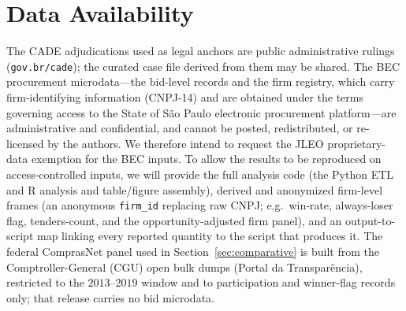 
\section*{Data Availability}

The CADE adjudications used as legal anchors are public administrative
rulings (\texttt{gov.br/cade}); the curated case file derived from them
may be shared. The BEC procurement microdata---the bid-level records and
the firm registry, which carry firm-identifying information (CNPJ-14) and
are obtained under the terms governing access to the State of S\~ao Paulo
electronic procurement platform---are administrative and confidential, and
cannot be posted, redistributed, or re-licensed by the authors. We
therefore intend to request the JLEO proprietary-data exemption for the
BEC inputs. To allow the results to be reproduced on access-controlled
inputs, we will provide the full analysis code (the Python ETL and R
analysis and table/figure assembly), derived and anonymized firm-level
frames (an anonymous \texttt{firm\_id} replacing raw CNPJ; e.g.\ win-rate,
always-loser flag, tenders-count, and the opportunity-adjusted firm
panel), and an output-to-script map linking every reported quantity to the
script that produces it. The federal ComprasNet panel used in
Section~\ref{sec:comparative} is built from the Comptroller-General (CGU)
open bulk dumps (Portal da Transpar\^encia), restricted to the
$2013$--$2019$ window and to participation and winner-flag records only;
that release carries no bid microdata.

